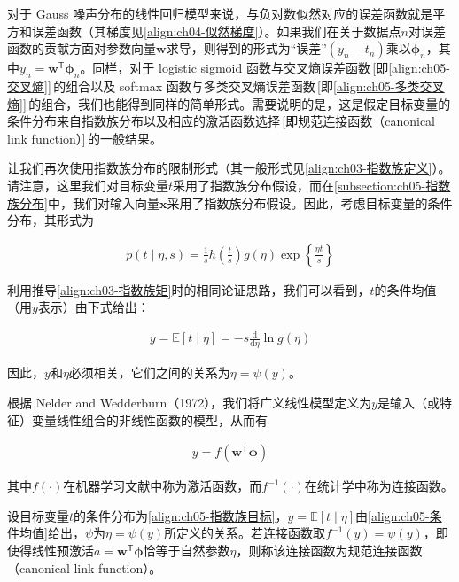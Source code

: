 \documentclass[../../main.tex]{subfiles}
\begin{document}
对于 Gauss 噪声分布的线性回归模型来说，与负对数似然对应的误差函数就是平方和误差函数（其梯度见\cref{align:ch04-似然梯度}）。如果我们在关于数据点$n$对误差函数的贡献方面对参数向量$\boldsymbol{w}$求导，则得到的形式为“误差”$(y_n-t_n)$乘以$\boldsymbol{\phi}_n$，其中$y_n=\boldsymbol{w}^{\mathsf{T}}\boldsymbol{\phi}_n$。同样，对于 logistic sigmoid 函数与交叉熵误差函数\,[即\eqref{align:ch05-交叉熵}]\,的组合以及 softmax 函数与多类交叉熵误差函数\,[即\eqref{align:ch05-多类交叉熵}]\,的组合，我们也能得到同样的简单形式。需要说明的是，这是假定目标变量的条件分布来自指数族分布以及相应的激活函数选择\,[即规范连接函数（canonical link function）]\,的一般结果。

让我们再次使用指数族分布的限制形式（其一般形式见\cref{align:ch03-指数族定义}）。请注意，这里我们对目标变量$t$采用了指数族分布假设，而在\cref{subsection:ch05-指数族分布}中，我们对输入向量$\boldsymbol{x}$采用了指数族分布假设。因此，考虑目标变量的条件分布，其形式为

\begin{align}
  p(t\mid\eta,s)=\frac{1}{s}h\left(\frac{t}{s}\right)g(\eta)\exp\left\{\frac{\eta t}{s}\right\}
  \label{align:ch05-指数族目标}
\end{align}

利用推导\cref{align:ch03-指数族矩}时的相同论证思路，我们可以看到，$t$的条件均值（用$y$表示）由下式给出：

\begin{align}
  y=\mathbb{E}[t\mid\eta]=-s\frac{\mathrm{d}}{\mathrm{d}\eta}\ln g(\eta)
  \label{align:ch05-条件均值}
\end{align}

因此，$y$和$\eta$必须相关，它们之间的关系为$\eta=\psi(y)$。

根据 Nelder and Wedderburn（1972），我们将广义线性模型定义为$y$是输入（或特征）变量线性组合的非线性函数的模型，从而有

\begin{align}
  y=f\left(\boldsymbol{w}^{\mathsf{T}}\boldsymbol{\phi}\right)
  \label{align:ch05-广义线性}
\end{align}

其中$f(\cdot)$在机器学习文献中称为激活函数，而$f^{-1}(\cdot)$在统计学中称为连接函数。

\begin{definition}[规范连接函数]\label{definition:ch05-规范连接函数}
设目标变量$t$的条件分布为\eqref{align:ch05-指数族目标}，$y=\mathbb{E}[t\mid\eta]$由\eqref{align:ch05-条件均值}给出，$\psi$为$\eta=\psi(y)$所定义的关系。若连接函数取$f^{-1}(y)=\psi(y)$，即使得线性预激活$a=\boldsymbol{w}^{\mathsf{T}}\boldsymbol{\phi}$恰等于自然参数$\eta$，则称该连接函数为规范连接函数（canonical link function）。
\end{definition}
\end{document}
